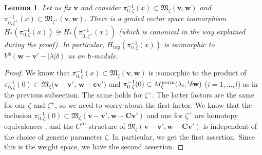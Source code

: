\documentclass[10pt,a4paper]{amsart}
\newtheorem{Lemma}[equation]{Lemma}
\theoremstyle{definition}
\numberwithin{equation}{section}
\newcommand{\lsp}[2]{{\mskip-.3mu}{}^{#1}\mskip-1mu{#2}}
\newcommand{\g}{{\mathfrak g}}
\newcommand{\M}{{\mathfrak M}} %
\newcommand{\bv}{{\mathbf v}} %
\newcommand{\bw}{{\mathbf w}} %
\newcommand{\bC}{{\mathbf C}} %
\newcommand{\bc}{\mathbf c}
\newcommand{\topdeg}{{\operatorname{top}}} %
\begin{document}
\begin{Lemma}
  Let us fix $\bv$ and consider $\pi_{0,\zeta}^{-1}(x)\subset
  \M_{\zeta}(\bv,\bw)$ and $\pi_{0,\zeta^+}^{-1}(x)\subset
  \M_{\zeta^+}(\bv,\bw)$. There is a graded vector space isomorphism
\(
   H_{*}(\pi_{0,\zeta}^{-1}(x)%
   )
   \cong
   H_{*}(\pi_{0,\zeta^+}^{-1}(x)%
   )
\)
\textup(which is canonical in the way explained during the
proof\textup). In particular, $H_{\topdeg}(\pi_{0,\zeta}^{-1}(x))$ is
isomorphic to $V^\g(\bw - \bv' - |\lambda|\delta)$ as an $\mathfrak
h$-module.
\end{Lemma}

\begin{proof}
  We know that $\pi_{0,\zeta}^{-1}(x)\subset \M_{\zeta}(\bv,\bw)$ is
  isomorphic to the product of $\pi_{0,\zeta}^{-1}(0)\subset
  \M_{\zeta}(\bv-\bv'$, $\bw-\bc\bv')$ and $\pi_{0,\zeta}^{-1}(0)\subset
  M_\zeta^{\text{norm}}(\lambda_i,\lsp{t}{\delta}\bw)$ ($i=1,\dots,
  l$) as in the previous subsection. The same holds for $\zeta^+$. The
  latter factors are the same for our $\zeta$ and $\zeta^+$, so we
  need to worry about the f\/irst factor. We know that the inclusion
  $\pi_{0,\zeta}^{-1}(0)\subset \M_\zeta(\bv-\bv',\bw-\bC\bv')$ and
  one for $\zeta^+$ are homotopy equivalences \cite[5.5]{Na-quiver},
  and the $C^\infty$-structure of $\M_\zeta(\bv-\bv',\bw-\bC\bv')$ is
  independent of the choice of generic parameter $\zeta$. In
  particular, we get the f\/irst assertion. Since this is the weight
  space, we have the second assertion.
\end{proof}
\end{document}

